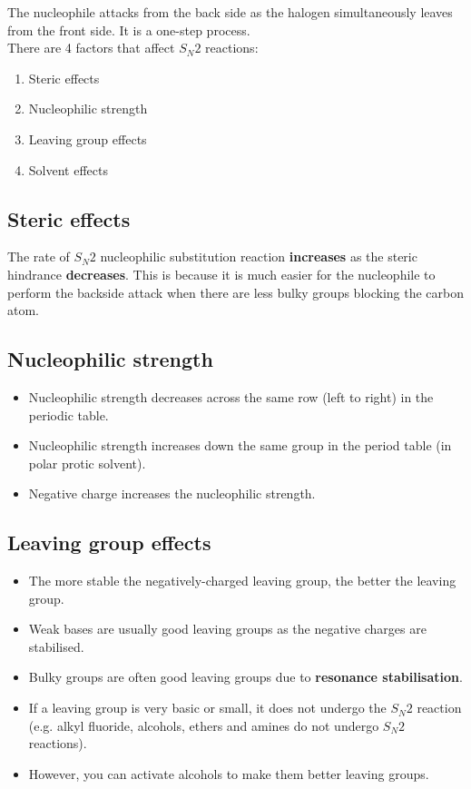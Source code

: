 \documentclass[11pt]{article}
\begin{document}
The nucleophile attacks from the back side as the halogen simultaneously leaves from the front side. It is a one-step process.
\\[0pt]

There are 4 factors that affect \(S_N 2\) reactions:
\begin{enumerate}
\item Steric effects
\item Nucleophilic strength
\item Leaving group effects
\item Solvent effects
\end{enumerate}

\subsection{Steric effects}
\label{sec:org33b93a4}
The rate of \(S_N 2\) nucleophilic substitution reaction \textbf{increases} as the steric hindrance \textbf{decreases}. This is because it is much easier for the nucleophile to perform the backside attack when there are less bulky groups blocking the carbon atom.

\subsection{Nucleophilic strength}
\label{sec:org6e19a64}
\begin{itemize}
\item Nucleophilic strength decreases across the same row (left to right) in the periodic table.
\item Nucleophilic strength increases down the same group in the period table (in polar protic solvent).
\item Negative charge increases the nucleophilic strength.
\end{itemize}

\subsection{Leaving group effects}
\label{sec:org7b9107f}
\begin{itemize}
\item The more stable the negatively-charged leaving group, the better the leaving group.
\item Weak bases are usually good leaving groups as the negative charges are stabilised.
\item Bulky groups are often good leaving groups due to \textbf{resonance stabilisation}.
\item If a leaving group is very basic or small, it does not undergo the \(S_N 2\) reaction (e.g. alkyl fluoride, alcohols, ethers and amines do not undergo \(S_N 2\) reactions).
\item However, you can activate alcohols to make them better leaving groups.
\end{itemize}
\end{document}
